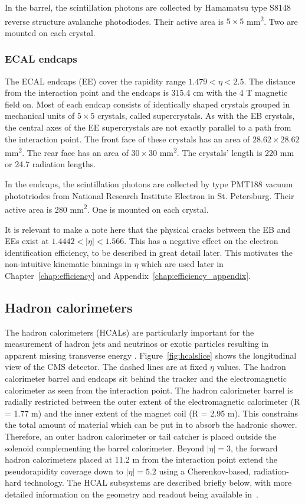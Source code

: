 In the barrel, the scintillation photons are collected by Hamamatsu type S8148 reverse structure avalanche photodiodes.
Their active area is $5\times5$ mm\textsuperscript{2}. Two are mounted on each crystal.

\subsubsection{ECAL endcaps}
The ECAL endcaps (EE) cover the rapidity range $1.479 < \eta < 2.5$.
The distance from the interaction point and the endcaps is 315.4 cm with the 4 T magnetic field on.
Most of each endcap consists of identically shaped crystals grouped in mechanical units of $5\times5$ crystals, called supercrystals.
As with the EB crystals, the central axes of the EE supercrystals are not exactly parallel to a path from the interaction point. 
The front face of these crystals has an area of $28.62\times28.62$ mm\textsuperscript{2}.
The rear face has an area of $30\times30$ mm\textsuperscript{2}.
The crystals' length is 220 mm or 24.7 radiation lengths.

In the endcaps, the scintillation photons are collected by type PMT188 vacuum phototriodes
from National Research Institute Electron in St. Petersburg.
Their active area is 280 mm\textsuperscript{2}. One is mounted on each crystal.

It is relevant to make a note here that the physical cracks between the EB and EEs exist at $1.4442 < |\eta| < 1.566$. 
This has a negative effect on the electron identification efficiency, to be described in great detail later.
This motivates the non-intuitive kinematic binnings in $\eta$ which are used later
in Chapter~\ref{chap:efficiency} and Appendix~\ref{chap:efficiency_appendix}.

\subsection{Hadron calorimeters}
The hadron calorimeters (HCALs) are particularly important for the measurement of hadron jets and neutrinos or exotic particles resulting in apparent missing transverse energy \cite{CMSTDR}.
Figure~\ref{fig:hcalslice} shows the longitudinal view of the CMS detector. The dashed lines are at fixed $\eta$ values. 
The hadron calorimeter barrel and endcaps sit behind the tracker and the electromagnetic
calorimeter as seen from the interaction point. The hadron calorimeter barrel is radially restricted
between the outer extent of the electromagnetic calorimeter (R = 1.77 m) and the inner extent of
the magnet coil (R = 2.95 m). This constrains the total amount of material which can be put in
to absorb the hadronic shower. Therefore, an outer hadron calorimeter or tail catcher is placed
outside the solenoid complementing the barrel calorimeter. Beyond $|\eta| = 3$, the forward hadron
calorimeters placed at 11.2 m from the interaction point extend the pseudorapidity coverage down
to $|\eta| = 5.2$ using a Cherenkov-based, radiation-hard technology.
The HCAL subsystems are described briefly below, with more detailed information on the geometry and 
readout being available in~\cite{CMSTDR}.

